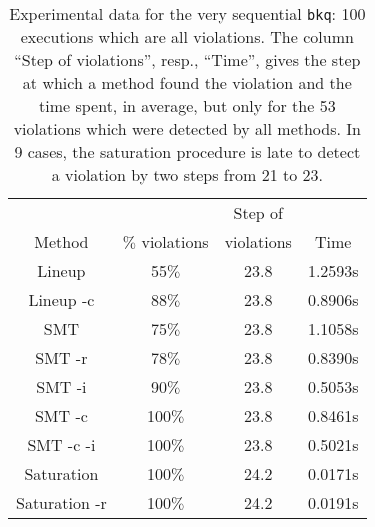 \begin{table}[t]
  \footnotesize
  \centering
  \setlength{\tabcolsep}{1.8mm}
  \begin{tabular}{cccc}
   	        & 	                     & Step of     \\
   Method & $\%$ violations  & violations & Time \\
  \hline
  Lineup & 55$\%$ & 23.8 & 1.2593s \\
  Lineup -c & 88$\%$ & 23.8 & 0.8906s \\
  SMT & 75$\%$ & 23.8 & 1.1058s \\
  SMT -r & 78$\%$ & 23.8 & 0.8390s\\
  SMT -i & 90$\%$ & 23.8 & 0.5053s\\
  SMT -c & 100$\%$ & 23.8 & 0.8461s \\
  SMT -c -i & 100$\%$ & 23.8 & 0.5021s \\
  Saturation & 100$\%$ & 24.2 & 0.0171s\\
  Saturation -r  & 100$\%$ & 24.2 & 0.0191s
  \end{tabular} 
  \caption{Experimental data for the very sequential {\tt bkq}: 100 executions which are all violations. The column ``Step of violations'', resp., ``Time'',
  gives the step at which a method found the violation and the time spent, in average, but only for the 53 violations
  which were detected by all methods. In 9 cases, the saturation procedure is late to detect a violation by two steps
  from 21 to 23.
    }
  \label{tab:exp:static}
\end{table}
